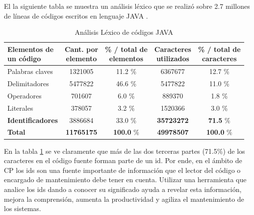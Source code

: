El la siguiente tabla se muestra un análisis léxico que se realizó sobre 2.7 millones de líneas de códigos escritos en lenguaje JAVA \cite{DFPM05,DMDJ13}.

\begin{center}

	\begin{table}[h]	
		\centering
   		\begin{tabular}{| l | c | c | c | c | }  
       
       \hline
  	   \shortstack{\textbf{Elementos de} \\ \textbf{un código}} & \shortstack{\textbf{Cant. por}\\\textbf{elemento}} & \shortstack{\textbf{\% / total de}\\\textbf{elementos}} & \shortstack{\textbf{Caracteres}\\\textbf{utilizados}} & \shortstack{\textbf{\% / total de}\\\textbf{caracteres}} \\ \hline
  	   Palabras claves & 1321005 & 11.2 \% & 6367677 & 12.7 \%\\ \hline
   	   Delimitadores & 5477822 & 46.6 \% & 5477822 & 11.0 \%\\ \hline
       Operadores & 701607 & 6.0 \% & 889370 & 1.8 \%\\ \hline
       Literales & 378057 & 3.2 \% & 1520366 & 3.0 \%\\ \hline          
       \textbf{Identificadores} & 3886684 & 33.0 \% & \textbf{35723272} & \textbf{71.5} \%\\ \hline
       \textbf{Total} & \textbf{11765175} & \textbf{100.0} \% & \textbf{49978507} & \textbf{100.0} \%\\ \hline
     
   	\end{tabular}  
	   
   \caption{Análisis Léxico de códigos JAVA}
   \label{tabla1}
   
  \end{table} 

\end{center}

\vspace{-2.5em}

En la tabla \ref{tabla1} se ve claramente que más de las dos terceras partes (71.5\%) de los caracteres en el código fuente forman parte de un id. 
Por ende, en el ámbito de CP los ids son una fuente importante de información que el lector del código o encargado de mantenimiento debe tener en cuenta. Utilizar una herramienta que analice los ids dando a conocer su significado ayuda a revelar esta información, mejora la comprensión, aumenta la productividad y agiliza el mantenimiento de los sistemas.

